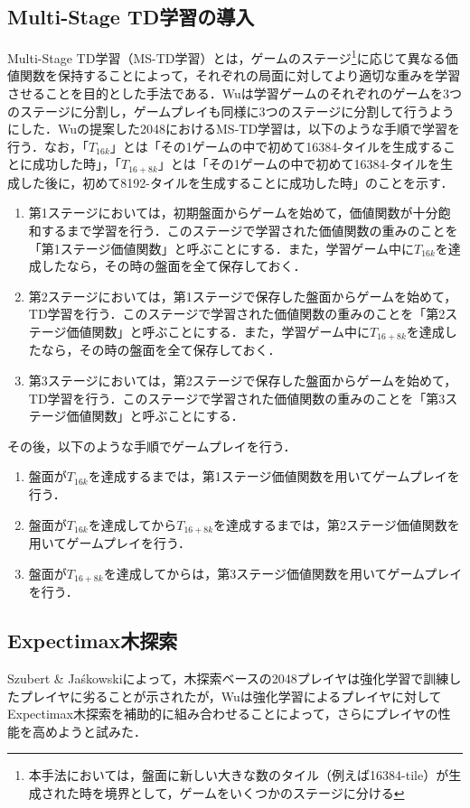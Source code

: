 \documentclass{suribt}
\begin{document}
\subsection{Multi-Stage TD学習の導入}
Multi-Stage TD学習（MS-TD学習）とは，ゲームのステージ\footnote{本手法においては，盤面に新しい大きな数のタイル（例えば16384-tile）が生成された時を境界として，ゲームをいくつかのステージに分ける}に応じて異なる価値関数を保持することによって，それぞれの局面に対してより適切な重みを学習させることを目的とした手法である．Wuは学習ゲームのそれぞれのゲームを3つのステージに分割し，ゲームプレイも同様に3つのステージに分割して行うようにした．Wuの提案した2048におけるMS-TD学習は，以下のような手順で学習を行う．なお，「$T_{16k}$」とは「その1ゲームの中で初めて16384-タイルを生成することに成功した時」，「$T_{16+8k}$」とは「その1ゲームの中で初めて16384-タイルを生成した後に，初めて8192-タイルを生成することに成功した時」のことを示す．

\begin{enumerate}
\item 第1ステージにおいては，初期盤面からゲームを始めて，価値関数が十分飽和するまで学習を行う．このステージで学習された価値関数の重みのことを「第1ステージ価値関数」と呼ぶことにする．また，学習ゲーム中に$T_{16k}$を達成したなら，その時の盤面を全て保存しておく．
\item 第2ステージにおいては，第1ステージで保存した盤面からゲームを始めて，TD学習を行う．このステージで学習された価値関数の重みのことを「第2ステージ価値関数」と呼ぶことにする．また，学習ゲーム中に$T_{16+8k}$を達成したなら，その時の盤面を全て保存しておく．
\item 第3ステージにおいては，第2ステージで保存した盤面からゲームを始めて，TD学習を行う．このステージで学習された価値関数の重みのことを「第3ステージ価値関数」と呼ぶことにする．
\end{enumerate}

その後，以下のような手順でゲームプレイを行う．

\begin{enumerate}
\item 盤面が$T_{16k}$を達成するまでは，第1ステージ価値関数を用いてゲームプレイを行う．
\item 盤面が$T_{16k}$を達成してから$T_{16+8k}$を達成するまでは，第2ステージ価値関数を用いてゲームプレイを行う．
\item 盤面が$T_{16+8k}$を達成してからは，第3ステージ価値関数を用いてゲームプレイを行う．
\end{enumerate}

\subsection{Expectimax木探索}
Szubert \& Ja\'{s}kowskiによって，木探索ベースの2048プレイヤは強化学習で訓練したプレイヤに劣ることが示されたが，Wuは強化学習によるプレイヤに対してExpectimax木探索を補助的に組み合わせることによって，さらにプレイヤの性能を高めようと試みた．
\end{document}
